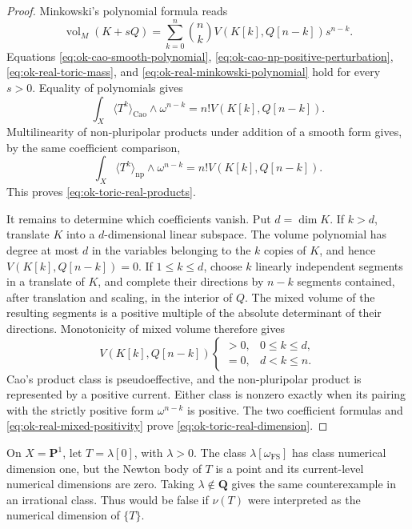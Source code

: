 \begin{proof}
Minkowski's polynomial formula reads
\[
 \operatorname{vol}_M(K+sQ)
 =\sum_{k=0}^n\binom nk
       V(K[k],Q[n-k])s^{n-k}.
\tag{55.57}\label{eq:ok-real-minkowski-polynomial}
\]
Equations \eqref{eq:ok-cao-smooth-polynomial},
\eqref{eq:ok-cao-np-positive-perturbation},
\eqref{eq:ok-real-toric-mass}, and
\eqref{eq:ok-real-minkowski-polynomial} hold for every $s>0$.  Equality of
polynomials gives
\[
 \int_X\langle T^k\rangle_{\mathrm{Cao}}\wedge\omega^{n-k}
       =n!V(K[k],Q[n-k]).
\]
Multilinearity of non-pluripolar products under addition of a smooth form
\cite[Proposition~1.4]{BEGZ10} gives, by the same coefficient comparison,
\[
 \int_X\langle T^k\rangle_{\mathrm{np}}\wedge\omega^{n-k}
       =n!V(K[k],Q[n-k]).
\]
This proves \eqref{eq:ok-toric-real-products}.

It remains to determine which coefficients vanish.  Put $d=\dim K$.  If
$k>d$, translate $K$ into a $d$-dimensional linear subspace.  The
volume polynomial has degree at most $d$ in the variables belonging to
the $k$ copies of $K$, and hence
$V(K[k],Q[n-k])=0$.  If $1\leq k\leq d$, choose $k$ linearly
independent segments in a translate of $K$, and complete their directions
by $n-k$ segments contained, after translation and scaling, in the
interior of $Q$.  The mixed volume of the resulting segments is a positive
multiple of the absolute determinant of their directions.  Monotonicity of
mixed volume therefore gives
\[
 V(K[k],Q[n-k])
 \begin{cases}
  >0,&0\leq k\leq d,\\
  =0,&d<k\leq n.
 \end{cases}
\tag{55.58}\label{eq:ok-real-mixed-positivity}
\]
Cao's product class is pseudoeffective, and the non-pluripolar product is
represented by a positive current.  Either class is nonzero exactly when
its pairing with the strictly positive form $\omega^{n-k}$ is positive.
The two coefficient formulas and
\eqref{eq:ok-real-mixed-positivity} prove
\eqref{eq:ok-toric-real-dimension}.
\end{proof}

\begin{example}\label{ex:ok-real-toric-class-current}
On $X=\mathbf P^1$, let $T=\lambda[0]$, with $\lambda>0$.  The class
$\lambda[\omega_{\mathrm{FS}}]$ has class numerical dimension one, but
the Newton body of $T$ is a point and its current-level numerical
dimensions are zero.  Taking $\lambda\notin\mathbf Q$ gives the same
counterexample in an irrational class.  Thus
 would be false if
$\nu(T)$ were interpreted as the numerical dimension of $\{T\}$.
\end{example}

